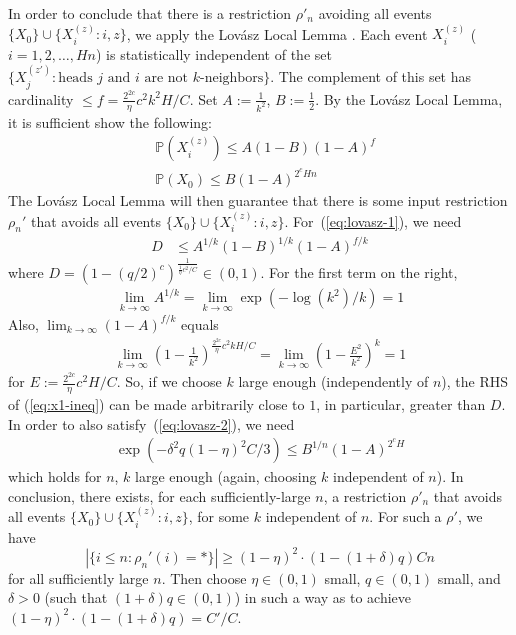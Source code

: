 \documentclass[11pt,a4paper]{article}
\newcommand{\Prob}{\mathbb{P}}%
\begin{document}
In order to conclude that there is a restriction $\rho'_n$ avoiding all events $\{X_0\} \cup \{X_i^{(z)} : i, z\}$, we apply the Lov{\'a}sz Local Lemma \cite[Theorem 6.17]{mitzenmacherprobability}.
Each event $X_i^{(z)}$ ($i=1,2,\dots, Hn$) is statistically independent of the set $\{X_j^{(z')} : \text{heads } j \text{ and } i \text{ are not $k$-neighbors}\}$.
The complement of this set has cardinality $\leq f= \frac{2^{2c}}{\eta}c^2k^2H/C$.
Set $A:=\frac{1}{k^2}$, $B:=\frac{1}{2}$.
By the Lov{\'a}sz Local Lemma, it is sufficient show the following: %
\begin{align}\label{eq:lovasz-1}
&\Prob(X_i^{(z)}) \leq A(1-B)(1-A)^{f} \\ \label{eq:lovasz-2}
&\Prob(X_0)  \leq B (1-A)^{2^cHn}
\end{align}
The Lov{\'a}sz Local Lemma will then guarantee that there is some input restriction $\rho_n'$ that avoids all events $\{X_0\} \cup \{X_i^{(z)} : i, z\}$.
For~(\ref{eq:lovasz-1}), we need
\begin{align}\label{eq:x1-ineq}
    D &\leq A^{1/k}(1-B)^{1/k}(1-A)^{f/k} 
\end{align}
where $D =  \left(1-(q/2)^c\right)^{\frac{1}{\frac{1}{\eta}c^2/C}} \in (0,1)$.
For the first term on the right, 
\begin{align*}
\lim_{k\rightarrow \infty} A^{1/k} = \lim_{k\rightarrow \infty} \exp\left(-\log(k^2) / k\right) = 1
\end{align*}
Also, $\lim_{k\rightarrow \infty} (1-A)^{f/k}$ equals
\begin{align*}
\lim_{k\rightarrow \infty} \left(1-\frac{1}{k^2}\right)^{\frac{2^{2c}}{\eta}c^2kH/C} = \lim_{k\rightarrow \infty} \left(1-\frac{E^2}{k^2}\right)^{k} = 1
\end{align*}
for $E := \frac{2^{2c}}{\eta}c^2H/C$. So, if we choose $k$ large enough (independently of $n$), the RHS of (\ref{eq:x1-ineq}) can be made arbitrarily close to $1$, in particular, greater than $D$.
In order to also satisfy~(\ref{eq:lovasz-2}), we need
\begin{align*}
\exp\left(-\delta^2q(1-\eta)^2C/3\right)  \leq B^{1/n} (1-A)^{2^c H}
\end{align*}
which holds for $n$, $k$ large enough (again, choosing $k$ independent of $n$). 
In conclusion, there exists, for each sufficiently-large $n$, a restriction $\rho'_n$ that avoids all events $\{X_0\} \cup \{X_i^{(z)} : i, z\}$, for some $k$ independent of $n$.
For such a $\rho'$, we have
\begin{equation*}
|\{i \leq n: \rho_n'(i) = *\}|\geq (1-\eta)^2\cdot (1-(1+\delta)q) C n
\end{equation*}
for all sufficiently large $n$.
Then choose $\eta \in (0,1)$ small, $q \in (0,1)$ small, and $\delta >0$ (such that $(1+\delta)q \in (0,1)$) in such a way as to achieve $(1-\eta)^2\cdot (1-(1+\delta)q) = C'/C$.
\end{document}
